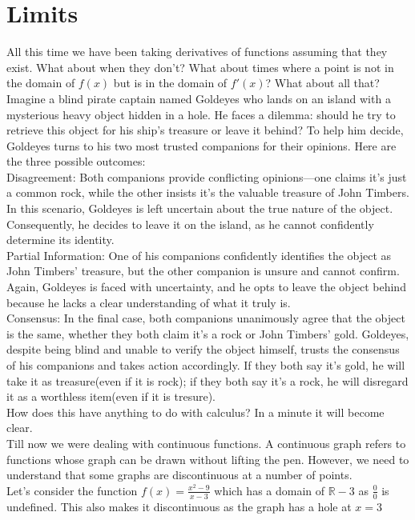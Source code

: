 \section{Limits}
All this time we have been taking derivatives of functions assuming that they exist. What about when they don't? What about times where a point is not in the domain of $f(x)$ but is in the domain of $f'(x)$? What about all that?\\
Imagine a blind pirate captain named Goldeyes who lands on an island with a mysterious heavy object hidden in a hole. He faces a dilemma: should he try to retrieve this object for his ship's treasure or leave it behind? To help him decide, Goldeyes turns to his two most trusted companions for their opinions. Here are the three possible outcomes:\\
Disagreement: Both companions provide conflicting opinions—one claims it's just a common rock, while the other insists it's the valuable treasure of John Timbers. In this scenario, Goldeyes is left uncertain about the true nature of the object. Consequently, he decides to leave it on the island, as he cannot confidently determine its identity.\\
Partial Information: One of his companions confidently identifies the object as John Timbers' treasure, but the other companion is unsure and cannot confirm. Again, Goldeyes is faced with uncertainty, and he opts to leave the object behind because he lacks a clear understanding of what it truly is.\\
Consensus: In the final case, both companions unanimously agree that the object is the same, whether they both claim it's a rock or John Timbers' gold. Goldeyes, despite being blind and unable to verify the object himself, trusts the consensus of his companions and takes action accordingly. If they both say it's gold, he will take it as treasure(even if it is rock); if they both say it's a rock, he will disregard it as a worthless item(even if it is tresure).\\
How does this have anything to do with calculus? In a minute it will become clear.\\
Till now we were dealing with continuous functions. A continuous graph refers to functions whose graph can be drawn without lifting the pen. However, we need to understand that some graphs are discontinuous at a number of points.\\
Let's consider the function $f(x)=\frac{x^2-9}{x-3}$ which has a domain of $\mathbb{R}-3$ as $\frac{0}{0}$ is undefined. This also makes it discontinuous as the graph has a hole at $x=3$\\
